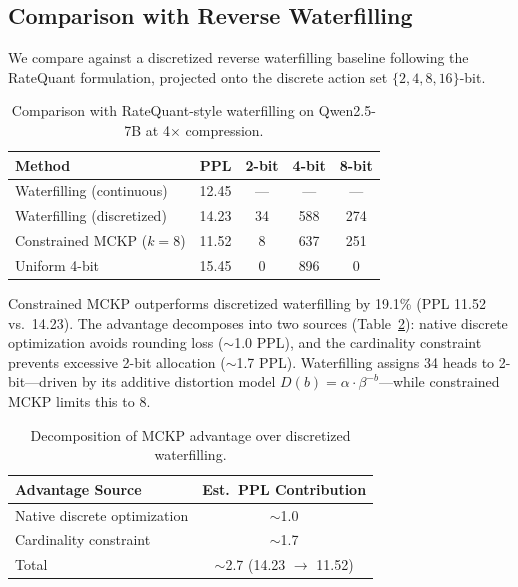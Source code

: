 \documentclass[11pt,a4paper]{article}
\begin{document}
\subsection{Comparison with Reverse Waterfilling}
\label{sec:waterfilling}

We compare against a discretized reverse waterfilling baseline following the RateQuant formulation, projected onto the discrete action set $\{2, 4, 8, 16\}$-bit.

\begin{table}[t]
\centering
\small
\caption{Comparison with RateQuant-style waterfilling on Qwen2.5-7B at 4$\times$ compression.}
\label{tab:waterfilling}
\begin{tabular}{lcccc}
\toprule
\textbf{Method} & \textbf{PPL} & \textbf{2-bit} & \textbf{4-bit} & \textbf{8-bit} \\
\midrule
Waterfilling (continuous) & 12.45 & --- & --- & --- \\
Waterfilling (discretized) & 14.23 & 34 & 588 & 274 \\
Constrained MCKP ($k{=}8$) & 11.52 & 8 & 637 & 251 \\
Uniform 4-bit & 15.45 & 0 & 896 & 0 \\
\bottomrule
\end{tabular}
\end{table}

Constrained MCKP outperforms discretized waterfilling by 19.1\% (PPL 11.52 vs.\ 14.23).
The advantage decomposes into two sources (Table~\ref{tab:advantage}): native discrete optimization avoids rounding loss ($\sim$1.0 PPL), and the cardinality constraint prevents excessive 2-bit allocation ($\sim$1.7 PPL).
Waterfilling assigns 34 heads to 2-bit---driven by its additive distortion model $D(b) = \alpha \cdot \beta^{-b}$---while constrained MCKP limits this to 8.

\begin{table}[t]
\centering
\small
\caption{Decomposition of MCKP advantage over discretized waterfilling.}
\label{tab:advantage}
\begin{tabular}{lc}
\toprule
\textbf{Advantage Source} & \textbf{Est.\ PPL Contribution} \\
\midrule
Native discrete optimization & $\sim$1.0 \\
Cardinality constraint & $\sim$1.7 \\
\midrule
Total & $\sim$2.7 (14.23 $\to$ 11.52) \\
\bottomrule
\end{tabular}
\end{table}
\end{document}
